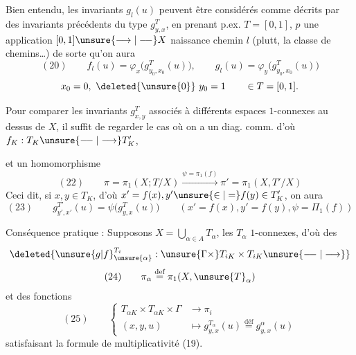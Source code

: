 Bien entendu, les invariants $g_l(u)$  peuvent être considérés comme décrits par des invariants précédents du type $g_{y,x}^T$, en prenant  p.ex. $T=[0,1]$, $p$ une application $[0,1]\unsure{\longrightarrow|\relbar\joinrel\relbar}X$  naissance  chemin $l$ (plutt,  la classe de chemins\ldots) de sorte qu'on aura
\[
(20)\qquad f_l(u)=\varphi_x\bigl(g_{y_0,x_0}^T(u)\bigr),\qquad g_l(u)=\varphi_y\bigl(g_{y_0,x_0}^T(u)\bigr)
\]
\[
x_0=0,\ \deleted{\unsure{0}}\ y_0=1\qquad\in T=[0,1].
\]

Pour comparer les invariants $g_{x,y}^T$ associés à différents espaces $1$-connexes au dessus de $X$, il suffit de regarder le cas où on a un diag. comm.
d'où $f_K:T_K\unsure{\relbar\joinrel\relbar|\longrightarrow}T'_K$,

et un homomorphisme
\[
(22)\qquad
\pi=\pi_1(X;T/X)
\overset{\psi=\pi_1(f)}{\longrightarrow}
\pi'=\pi_1(X,T'/X)
\]
Ceci dit, si $x,y\in T_K$, d'où
$x'=f(x),y'\unsure{\in|=}f(y)\in T'_K$, on aura
\[
(23)\qquad
g_{y',x'}^{T'}(u)=\psi\bigl(g_{y,x}^{T}(u)\bigr)
\qquad
(x'=f(x),y'=f(y),\psi=\Pi_1(f))
\]

Conséquence pratique : Supposons
$X=\bigcup_{\alpha\in A}T_\alpha$, les $T_\alpha$ $1$-connexes,
d'où des  
\[
\deleted{
\unsure{g|f}_{\unsure{\alpha}}^{T_i}:
\unsure{\Gamma\times}T_{iK}\times T_{iK}
\unsure{\relbar\joinrel\relbar|\longrightarrow}
}
\]
\[
(24)\qquad
\pi_\alpha\overset{\text{def}}{=}\pi_1(X,\unsure{T}_\alpha)
\]
et des fonctions
\[
(25)\qquad
\left\{\begin{aligned}
T_{\alpha K}\times T_{\alpha K}\times\Gamma
&\longrightarrow\pi_i\\
(x,y,u)&\longmapsto
g_{y,x}^{T_\alpha}(u)\overset{\text{déf}}{=}g_{y,x}^{\alpha}(u)
\end{aligned}\right.
\]
satisfaisant la formule de multiplicativité (19).

